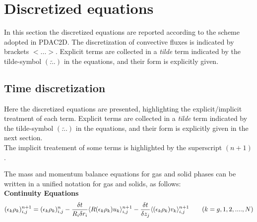 \section{Discretized equations \label{ch:FV}}
In this section the discretized equations are reported according to the scheme adopted
in PDAC2D. The discretization of convective fluxes is indicated by brackets
$<...>$. 
Explicit terms are collected in a {\em tilde} term indicated by the 
tilde-symbol $(\widetilde{...})$ in the equations, and their form is explicitly 
given.

\subsection{Time discretization}

Here the discretized equations are presented, highlighting the 
explicit/implicit treatment of each term.
Explicit terms are collected in a {\em tilde} term indicated by the 
tilde-symbol $(\widetilde{...})$ in the equations, and their form is 
explicitly given in the next section.\\
The implicit treatement of some terms is highlighted by the superscript $(n+1)$.

The mass and momentum balance equations for gas and solid phases can be written in a 
unified notation for gas and solids, as follows:\\

%
{\bf Continuity Equations}\\
%
\begin{eqnarray}
\htmlimage{}
(\epsilon_k \rho_k)_{i,j}^{n+1} = (\epsilon_k \rho_k)_{i,j}^{n} -
\frac{\delta t}{R_i \delta r_i} \langle R(\epsilon_k \rho_k) u_k \rangle_{i,j}^{n+1}-
\frac{\delta t}{\delta z_j} \langle (\epsilon_k \rho_k) v_k \rangle_{i,j}^{n+1}
\qquad (k=g,1,2, ....,N)
\nonumber
\end{eqnarray}\\

